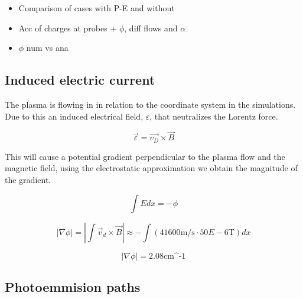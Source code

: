 \begin{itemize}
	\item Comparison of cases with P-E and without
	\item Acc of charges at probes + $\phi$, diff flows and $\alpha$
	\item $\phi$ num vs ana
\end{itemize}

\subsection{Induced electric current}
	The plasma is flowing in in relation to the coordinate system in the simulations.
	Due to this an induced electrical field, \(\varepsilon\), that neutralizes the Lorentz force.

	\begin{equation}
		\vec{\varepsilon} = \vec{v_D}\times \vec{B}
	\end{equation}

	This will cause a potential gradient perpendicular to the plasma flow and the magnetic field,
	using the electrostatic approximation we obtain the magnitude of the gradient.


	\begin{equation}
		\int{Edx} = -\phi
	\end{equation}

	\begin{equation}
		|\nabla\phi| = |\int \vec{v}_d\times\vec{B}| \approx -\int \left( 41600 \text{m/s}\cdot 50E-6 \text{T} \right) dx
	\end{equation}

	\begin{equation}
		|\nabla\phi| = 2.08 \text{cm^{-1}}
	\end{equation}



\subsection{Photoemmision paths}

